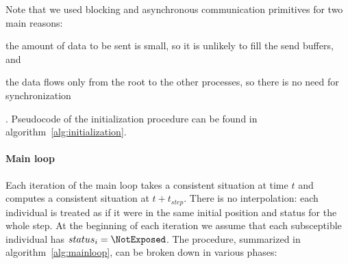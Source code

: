 Note that we used blocking and asynchronous communication primitives for two main reasons:
\begin{enumerate*}[label=(\roman*)]
    \item the amount of data to be sent is small, so it is unlikely to fill the send buffers, and
    \item the data flows only from the root to the other processes, so there is no need for synchronization
\end{enumerate*}.
Pseudocode of the initialization procedure can be found in algorithm~\ref{alg:initialization}.

\paragraph{Main loop}
Each iteration of the main loop takes a consistent situation at time $t$ and computes a consistent situation at $t + t_{step}$. There is no interpolation: each individual is treated as if it were in the same initial position and status for the whole step. At the beginning of each iteration we assume that each subsceptible individual has $status_i = \NotExposed$.
The procedure, summarized in algorithm~\ref{alg:mainloop}, can be broken down in various phases:
